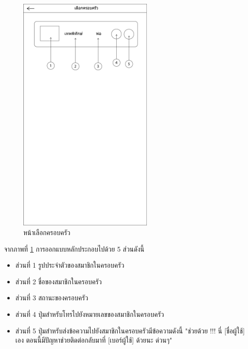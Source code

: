 		\begin{figure}[H]
			\centering
			\includegraphics[width=0.6\textwidth]{Figures/3/UI/helpfamily}
			\caption{หน้าเลือกครอบครัว}
			\label{Fig:เลือกครอบครัว}
		\end{figure}
		จากภาพที่ \ref{Fig:เลือกครอบครัว} การออกแบบหลักประกอบไปด้วย 5 ส่วนดังนี้
		\begin{itemize}
			\item ส่วนที่ 1 รูปประจำตัวของสมาชิกในครอบครัว
			\item ส่วนที่ 2 ชื่อของสมาชิกในครอบครัว
			\item ส่วนที่ 3 สถานะของครอบครัว
			\item ส่วนที่ 4 ปุ่มสำหรับโทรไปยังหมายเลขของสมาชิกในครอบครัว
			\item ส่วนที่ 5 ปุ่มสำหรับส่งข้อความไปยังสมาชิกในครอบครัวมีข้อความดังนี้ "ช่วยด้วย !!! นี่ [ชื่อผู้ใช้] เอง ตอนนี้มีปัญหาช่วยติดต่อกลับมาที่ [เบอร์ผู้ใช้] ด้วยนะ ด่วนๆ"
		\end{itemize}

